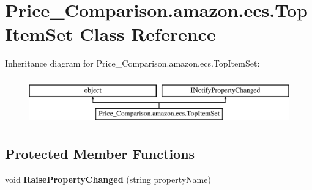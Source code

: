 \hypertarget{class_price___comparison_1_1amazon_1_1ecs_1_1_top_item_set}{\section{Price\-\_\-\-Comparison.\-amazon.\-ecs.\-Top\-Item\-Set Class Reference}
\label{class_price___comparison_1_1amazon_1_1ecs_1_1_top_item_set}
}


 


Inheritance diagram for Price\-\_\-\-Comparison.\-amazon.\-ecs.\-Top\-Item\-Set\-:\begin{figure}[H]
\begin{center}
\leavevmode
\includegraphics[height=2.000000cm]{class_price___comparison_1_1amazon_1_1ecs_1_1_top_item_set}
\end{center}
\end{figure}
\subsection*{Protected Member Functions}
\begin{DoxyCompactItemize}
\item 
\hypertarget{class_price___comparison_1_1amazon_1_1ecs_1_1_top_item_set_a0c1e8cd02ce4a22efc02d1d081602387}{void {\bfseries Raise\-Property\-Changed} (string property\-Name)}\label{class_price___comparison_1_1amazon_1_1ecs_1_1_top_item_set_a0c1e8cd02ce4a22efc02d1d081602387}

\end{DoxyCompactItemize}
